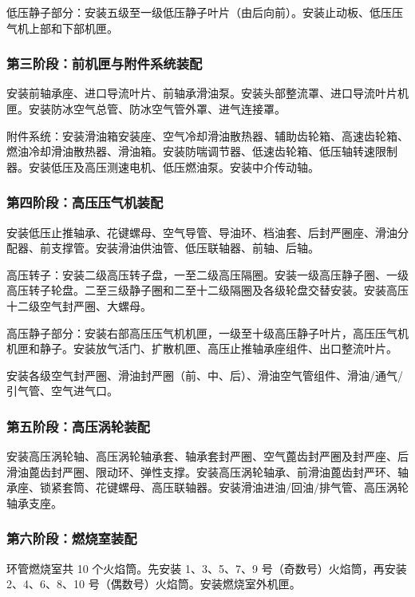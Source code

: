 低压静子部分：安装五级至一级低压静子叶片（由后向前）。安装止动板、低压压气机上部和下部机匣。

\subsubsection{第三阶段：前机匣与附件系统装配}

安装前轴承座、进口导流叶片、前轴承滑油泵。安装头部整流罩、进口导流叶片机匣。安装防冰空气总管、防冰空气管外罩、进气连接罩。

附件系统：安装滑油箱安装座、空气冷却滑油散热器、辅助齿轮箱、高速齿轮箱、燃油冷却滑油散热器、滑油箱。安装防喘调节器、低速齿轮箱、低压轴转速限制器。安装低压及高压测速电机、低压燃油泵。安装中介传动轴。

\subsubsection{第四阶段：高压压气机装配}

安装低压止推轴承、花键螺母、空气导管、导油环、档油套、后封严圈座、滑油分配器、前支撑管。安装滑油供油管、低压联轴器、前轴、后轴。

高压转子：安装二级高压转子盘，一至二级高压隔圈。安装一级高压静子圈、一级高压转子轮盘。二至三级静子圈和二至十二级隔圈及各级轮盘交替安装。安装高压十二级空气封严圈、大螺母。

高压静子部分：安装右部高压压气机机匣，一级至十级高压静子叶片，高压压气机机匣和静子。安装放气活门、扩散机匣、高压止推轴承座组件、出口整流叶片。

安装各级空气封严圈、滑油封严圈（前、中、后）、滑油空气管组件、滑油/通气/引气管、空气进气口。

\subsubsection{第五阶段：高压涡轮装配}

安装高压涡轮轴、高压涡轮轴承套、轴承套封严圈、空气蓖齿封严圈及封严座、后滑油蓖齿封严圈、限动环、弹性支撑。安装高压涡轮轴承、前滑油蓖齿封严环、轴承座、锁紧套筒、花键螺母、高压联轴器。安装滑油进油/回油/排气管、高压涡轮轴承支座。

\subsubsection{第六阶段：燃烧室装配}

环管燃烧室共 10 个火焰筒。先安装 1、3、5、7、9 号（奇数号）火焰筒，再安装 2、4、6、8、10 号（偶数号）火焰筒。安装燃烧室外机匣。

